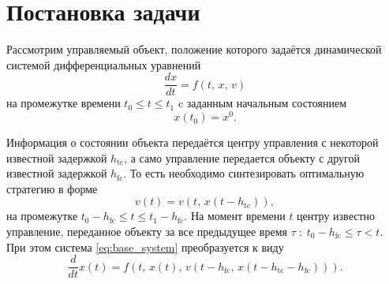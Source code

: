 \section{Постановка задачи}

Рассмотрим управляемый объект, положение которого задаётся динамической системой дифференциальных уравнений
\begin{equation}\label{eq:base_system}
        \frac{dx}{dt}
        =
        f(t,\,x,\,v)
\end{equation}
на промежутке времени $t_0 \leqslant t \leqslant t_1$ c заданным начальным состоянием
$$
        x(t_0) = x^0.
$$

Информация о состоянии объекта передаётся центру управления с некоторой известной задержкой $h_{\mathrm{tc}}$, а само управление передается объекту с другой известной задержкой $h_{\mathrm{fc}}$. То есть необходимо синтезировать оптимальную стратегию в форме
$$
        v(t) = v(t,\, x(t - h_{\mathrm{tc}})),
$$
на промежутке $t_0 - h_{\mathrm{fc}} \leqslant t \leqslant t_1 - h_{\mathrm{fc}}$. На момент времени $t$ центру известно управление, переданное объекту за все предыдущее время $\tau\;:\;t_0 - h_{\mathrm{fc}}\leqslant\tau < t$. При этом система \eqref{eq:base_system} преобразуется к виду
$$
        \frac{d}{dt}x(t)
        =
        f(t,\,x(t),\,v(t - h_{\mathrm{fc}},\, x(t - h_{\mathrm{tc}} - h_{\mathrm{fc}}))).
$$

